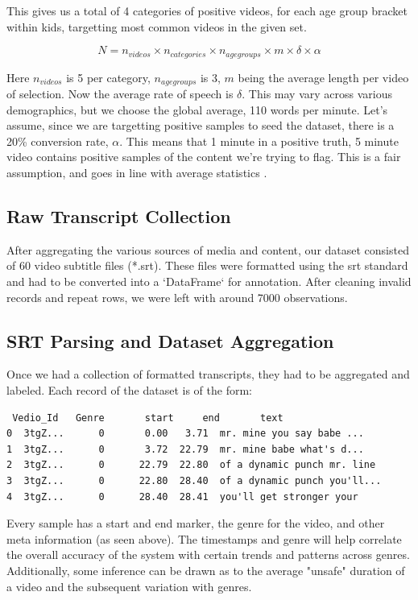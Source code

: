 \documentclass{article}[A4]
\begin{document}
This gives us a total of 4 categories of positive videos, for each age group bracket within kids, targetting most common videos in the given set.

$$
N = n_{videos} \times n_{categories} \times n_{age groups} \times m \times \delta \times \alpha
$$

Here $n_{videos}$ is 5 per category, $n_{age groups}$ is 3, $m$ being the average length per video of selection. Now the average rate of speech
is $\delta$. This may vary across various demographics, but we choose the global average, 110 words per minute. Let's assume, since we are targetting
positive samples to seed the dataset, there is a 20\% conversion rate, $\alpha$. This means that 1 minute in a positive truth, 5 minute video contains
positive samples of the content we're trying to flag. This is a fair assumption, and goes in line with average statistics \citep{videostats}.

\subsection{Raw Transcript Collection}

After aggregating the various sources of media and content, our dataset consisted of 60 video subtitle files (*.srt). These files were formatted using the srt standard and had to be converted into a `DataFrame` for annotation. After cleaning invalid records and repeat rows, we were left with around 7000 observations.

\subsection{SRT Parsing and Dataset Aggregation}

Once we had a collection of formatted transcripts, they had to be aggregated and labeled. Each record of the dataset is of the form:
\begin{verbatim}
 Vedio_Id	Genre       start     end       text 
0  3tgZ...      0       0.00   3.71  mr. mine you say babe ...
1  3tgZ...      0       3.72  22.79  mr. mine babe what's d...
2  3tgZ...      0      22.79  22.80  of a dynamic punch mr. line 
3  3tgZ...      0      22.80  28.40  of a dynamic punch you'll... 
4  3tgZ...      0      28.40  28.41  you'll get stronger your 
\end{verbatim}

Every sample has a start and end marker, the genre for the video, and other meta information (as seen above). The timestamps and genre will help correlate the overall accuracy of the system with certain trends and patterns across genres. Additionally, some inference can be drawn as to the average "unsafe" duration of a video and the subsequent variation with genres. \\
\end{document}
